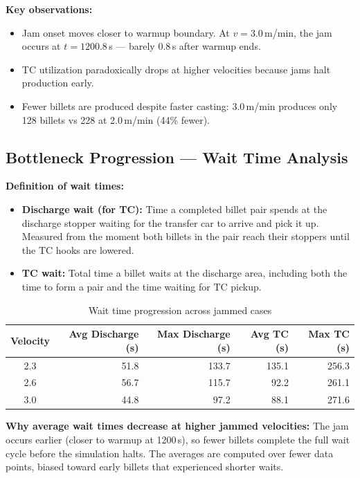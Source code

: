 \documentclass[11pt,a4paper]{article}
\begin{document}
\textbf{Key observations:}
\begin{itemize}
    \item Jam onset moves closer to warmup boundary. At $v = 3.0$\,m/min, the jam occurs at $t = 1200.8$\,s --- barely 0.8\,s after warmup ends.
    \item TC utilization paradoxically drops at higher velocities because jams halt production early.
    \item Fewer billets are produced despite faster casting: 3.0\,m/min produces only 128 billets vs 228 at 2.0\,m/min (44\% fewer).
\end{itemize}

\subsection{Bottleneck Progression --- Wait Time Analysis}

\textbf{Definition of wait times:}
\begin{itemize}
    \item \textbf{Discharge wait (for TC):} Time a completed billet pair spends at the discharge stopper waiting for the transfer car to arrive and pick it up. Measured from the moment both billets in the pair reach their stoppers until the TC hooks are lowered.
    \item \textbf{TC wait:} Total time a billet waits at the discharge area, including both the time to form a pair and the time waiting for TC pickup.
\end{itemize}

\begin{table}[H]
\centering
\caption{Wait time progression across jammed cases}
\label{tab:bottleneck-progression}
\begin{tabular}{@{}crrrr@{}}
\toprule
Velocity & Avg Discharge (s) & Max Discharge (s) & Avg TC (s) & Max TC (s) \\
\midrule
2.3 & 51.8 & 133.7 & 135.1 & 256.3 \\
2.6 & 56.7 & 115.7 & 92.2 & 261.1 \\
3.0 & 44.8 & 97.2 & 88.1 & 271.6 \\
\bottomrule
\end{tabular}
\end{table}

\textbf{Why average wait times decrease at higher jammed velocities:} The jam occurs earlier (closer to warmup at 1200\,s), so fewer billets complete the full wait cycle before the simulation halts. The averages are computed over fewer data points, biased toward early billets that experienced shorter waits.
\end{document}
